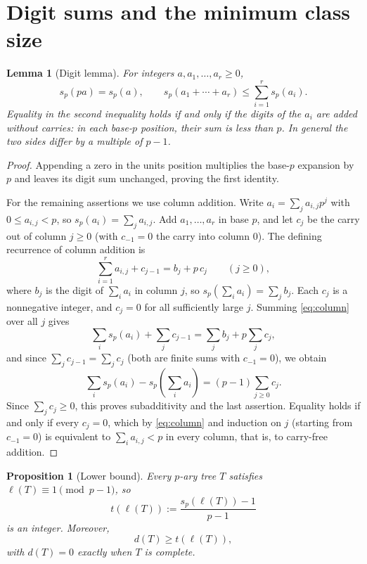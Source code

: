 \documentclass[11pt]{amsart}
\newtheorem{lemma}[theorem]{Lemma}
\newtheorem{proposition}[theorem]{Proposition}
\theoremstyle{definition}
\theoremstyle{remark}
\begin{document}
\section{Digit sums and the minimum class size}
\begin{lemma}[Digit lemma]\label{lem:digit}
For integers $a,a_1,\ldots,a_r\ge0$,
\[
 s_p(pa)=s_p(a),\qquad s_p(a_1+\cdots+a_r)\le\sum_{i=1}^rs_p(a_i).
\]
Equality in the second inequality holds if and only if the digits of the $a_i$ are added without carries: in each base-$p$ position, their sum is less than $p$.  In general the two sides differ by a multiple of $p-1$.
\end{lemma}
\begin{proof}
Appending a zero in the units position multiplies the base-$p$ expansion by $p$ and leaves its digit sum unchanged, proving the first identity.

For the remaining assertions we use column addition.  Write $a_i=\sum_j a_{i,j}p^j$ with $0\le a_{i,j}<p$, so $s_p(a_i)=\sum_j a_{i,j}$.  Add $a_1,\ldots,a_r$ in base $p$, and let $c_j$ be the carry out of column $j\ge0$ (with $c_{-1}=0$ the carry into column $0$).  The defining recurrence of column addition is
\begin{equation}\label{eq:column}
 \sum_{i=1}^r a_{i,j}+c_{j-1}=b_j+p\,c_j\qquad(j\ge0),
\end{equation}
where $b_j$ is the digit of $\sum_i a_i$ in column $j$, so $s_p(\sum_i a_i)=\sum_j b_j$.  Each $c_j$ is a nonnegative integer, and $c_j=0$ for all sufficiently large $j$.  Summing \eqref{eq:column} over all $j$ gives
\[
 \sum_i s_p(a_i)+\sum_j c_{j-1}=\sum_j b_j+p\sum_j c_j,
\]
and since $\sum_j c_{j-1}=\sum_j c_j$ (both are finite sums with $c_{-1}=0$), we obtain
\begin{equation}\label{eq:merges}
 \sum_i s_p(a_i)-s_p\!\left(\sum_i a_i\right)=(p-1)\sum_{j\ge0}c_j.
\end{equation}
Since $\sum_j c_j\ge0$, this proves subadditivity and the last assertion.  Equality holds if and only if every $c_j=0$, which by \eqref{eq:column} and induction on $j$ (starting from $c_{-1}=0$) is equivalent to $\sum_i a_{i,j}<p$ in every column, that is, to carry-free addition.
\end{proof}
\begin{proposition}[Lower bound]\label{prop:lower-bound}
Every $p$-ary tree $T$ satisfies $\ell(T)\equiv1\pmod{p-1}$, so
\[
 t(\ell(T)):=\frac{s_p(\ell(T))-1}{p-1}
\]
is an integer.  Moreover,
\[
 d(T)\ge t(\ell(T)),
\]
with $d(T)=0$ exactly when $T$ is complete.
\end{proposition}
\end{document}

